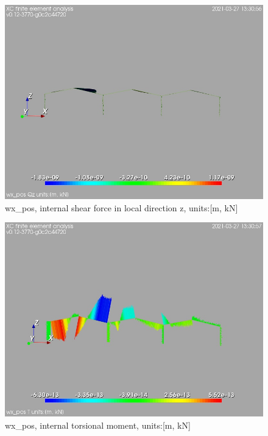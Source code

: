 \begin{figure}
\begin{center}
\includegraphics[width=\linewidth]{calc_results/sole_zeinali/text/graphics/resSimplLC/wx_posallMemberSetQz}
\caption{wx_pos, internal shear force in local direction z, units:[m, kN]}
\end{center}
\end{figure}
\begin{figure}
\begin{center}
\includegraphics[width=\linewidth]{calc_results/sole_zeinali/text/graphics/resSimplLC/wx_posallMemberSetT}
\caption{wx_pos, internal torsional moment, units:[m, kN]}
\end{center}
\end{figure}
